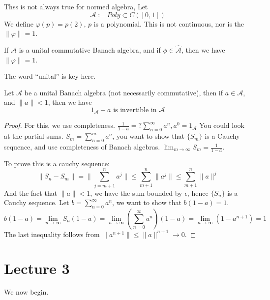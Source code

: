 Thss is not always true for normed algebra,
Let
\begin{equation*}
    \mathcal{A}:= Poly\subset C([0,1])
\end{equation*}
We define $\varphi(p)=p(2)$, $p$ is a polynomial. This is not continuous, nor is the $\|\varphi\|=1$.


\begin{proposition}
    If $\mathcal{A}$ is a unital commutative Banach algebra, and if $\phi\in\widehat{\mathcal{A}}$, then we have $\|\varphi\|=1$.
\end{proposition}

The word ``unital'' is key here.

\begin{proposition}
    Let $\mathcal{A}$ be a unital Banach algebra (not necessarily commutative), then if $a\in\mathcal{A}$, and $\|a\|< 1$, then we have
    \begin{equation*}
        1_\mathcal{A}-a \text{ is invertible in } \mathcal{A}
    \end{equation*}
\end{proposition}
\begin{proof}
    For this, we use completeness.
    $\frac{1}{1-a}=?\sum_{n=0}^\infty a^n, a^0=1_\mathcal{A}$
    You could look at the partial sums. $S_m=\sum_{n=0}^ma^n$, you want to show that $\{S_m\}$ is a Cauchy sequence, and use completeness of Banach algebras. $\lim_{m\to\infty}S_m=\frac{1}{1-a}$.
    
    To prove this is a cauchy sequence:
    \begin{equation*}
        \|S_n-S_m\|=\|\sum_{j=m+1}^na^j\|\leq\sum_{m+1}^n\|a^j\|\leq\sum_{m+1}^n\|a\|^j
    \end{equation*}
    And the fact that $\|a\|< 1$, we have the sum bounded by $\epsilon$, hence $\{S_n\}$ is a Cauchy sequence. Let $b=\sum_{n=0}^\infty a^n$, we want to show that $b(1-a)=1$.
    \begin{equation*}
        b(1-a)=\lim_{n\to\infty}{S_n}(1-a)=\lim_{n\to\infty}\left(\sum_{n=0}^\infty a^n\right)(1-a)=\lim_{n\to\infty}(1-a^{n+1})=1
    \end{equation*}
    The last inequality follows from $\|a^{n+1}\|\leq\|a\|^{n+1}\to 0$.
\end{proof}


\section{Lecture 3}
We now begin.


